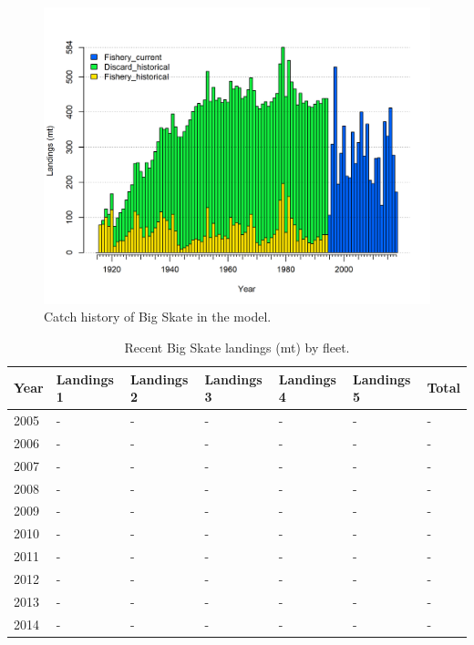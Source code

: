 \documentclass[12pt,]{article}
\begin{document}
\begin{figure}
\centering
\includegraphics{r4ss/plots_mod1/catch2 landings stacked.png}
\caption{Catch history of Big Skate in the model.
\label{fig:r4ss_catches}}
\end{figure}

\begin{table}[ht]
\centering
\caption{Recent Big Skate landings (mt) by 
                                            fleet.} 
\label{tab:Exec_catch}
\begin{tabular}{l>{\centering}p{1in}>{\centering}p{1in}>{\centering}p{1in}>{\centering}p{.9in}>{\centering}p{.9in}>{\centering}p{.6in}}
  \hline
Year & Landings 1 & Landings 2 & Landings 3 & Landings 4 & Landings 5 & Total \\ 
  \hline
2005 & - & - & - & - & - & - \\ 
  2006 & - & - & - & - & - & - \\ 
  2007 & - & - & - & - & - & - \\ 
  2008 & - & - & - & - & - & - \\ 
  2009 & - & - & - & - & - & - \\ 
  2010 & - & - & - & - & - & - \\ 
  2011 & - & - & - & - & - & - \\ 
  2012 & - & - & - & - & - & - \\ 
  2013 & - & - & - & - & - & - \\ 
  2014 & - & - & - & - & - & - \\ 
   \hline
\end{tabular}
\end{table}
\end{document}
